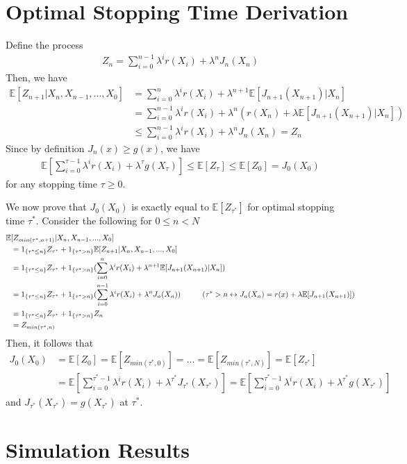 \begin{appendices}
\chapter{Optimal Stopping Time Derivation}\label{thm:ost}
Define the process
\begin{align*}
	Z_n = \sum_{i=0}^{n-1} \lambda^ir(X_i) + \lambda^nJ_n(X_n)
\end{align*}
Then, we have
\begin{align*}
	\mathbb{E}[Z_{n+1} \vert X_n, X_{n-1}, ..., X_0] &= \sum_{i=0}^n \lambda^ir(X_i) + \lambda^{n+1}\mathbb{E}[J_{n+1}(X_{n+1})\vert X_n]\\
	&= \sum_{i=0}^{n-1} \lambda^ir(X_i) + \lambda^n(r(X_n) + \lambda\mathbb{E}[J_{n+1}(X_{n+1})\vert X_n])\\
	&\leq \sum_{i=0}^{n-1} \lambda^i r(X_i) + \lambda^nJ_n(X_n) = Z_n
\end{align*}
Since by definition $J_n(x) \geq g(x)$, we have
\begin{align*}
	\mathbb{E}[\sum_{i=0}^{\tau-1}\lambda^ir(X_i) + \lambda^{\tau}g(X_{\tau})] \leq \mathbb{E}[Z_{\tau}] \leq \mathbb{E}[Z_0] = J_0(X_0)
\end{align*}
for any stopping time $\tau \geq 0$. 

We now prove that $J_0(X_0)$ is exactly equal to $\mathbb{E}[Z_{\tau^*}]$ for optimal stopping time $\tau^*$. Consider the following for $0 \leq n < N$
\begin{align*}
	\mathbb{E}&[Z_{min(\tau^*, n+1)}\vert X_n, X_{n-1}, ..., X_0]\\
	&= 1_{\{\tau^* \leq n\}}Z_{\tau^*} + 1_{\{\tau^* > n\}}\mathbb{E}[Z_{n+1}\vert X_n, X_{n-1}, ..., X_0]\\
	&= 1_{\{\tau^* \leq n\}}Z_{\tau^*} + 1_{\{\tau^* > n\}}(\sum_{i=0}^n \lambda^ir(X_i) + \lambda^{n+1}\mathbb{E}[J_{n+1}(X_{n+1})\vert X_n])\\
	&= 1_{\{\tau^* \leq n\}}Z_{\tau^*} + 1_{\{\tau^* > n\}}(\sum_{i=0}^{n-1} \lambda^ir(X_i) + \lambda^nJ_n(X_n)) \hspace*{1cm} (\tau^* > n\leftrightarrow J_n(X_n) = r(x) + \lambda\mathbb{E}[J_{n+1}(X_{n+1})])\\ 
	&= 1_{\{\tau^* \leq n\}}Z_{\tau^*} + 1_{\{\tau^* > n\}}Z_{n}\\
	&= Z_{min(\tau^*, n)}
\end{align*}
Then, it follows that
\begin{align*}
	J_0(X_0) &= \mathbb{E}[Z_0] = \mathbb{E}[Z_{min(\tau^*, 0)}] = ... = \mathbb{E}[Z_{min(\tau^*, N)}] = \mathbb{E}[Z_{\tau^*}]\\
			 &= \mathbb{E}[\sum_{i=0}^{\tau^* -1}\lambda^ir(X_i) + \lambda^{\tau^*}J_{\tau^*}(X_{\tau^*})] = \mathbb{E}[\sum_{i=0}^{\tau^* -1}\lambda^ir(X_i) + \lambda^{\tau^*}g(X_{\tau^*})]
\end{align*}
and $J_{\tau^*}(X_{\tau^*}) = g(X_{\tau^*})$ at $\tau^*$.

\chapter{Simulation Results}\label{ch:append-sims}
\end{appendices}
